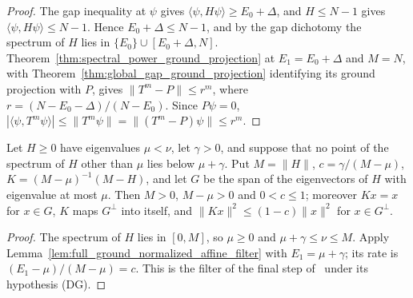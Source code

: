 \begin{proof}
    \leanok
    The gap inequality at $\psi$ gives $\langle\psi,H\psi\rangle\ge E_0+\Delta$,
    and $H\le N-1$ gives $\langle\psi,H\psi\rangle\le N-1$. Hence
    $E_0+\Delta\le N-1$, and by the gap dichotomy the spectrum of $H$ lies in
    $\{E_0\}\cup[E_0+\Delta,N]$. Theorem~\ref{thm:spectral_power_ground_projection}
    at $E_1=E_0+\Delta$ and $M=N$, with
    Theorem~\ref{thm:global_gap_ground_projection} identifying its ground
    projection with $P$, gives $\|T^m-P\|\le r^m$, where
    $r=(N-E_0-\Delta)/(N-E_0)$. Since $P\psi=0$,
    $|\langle\psi,T^m\psi\rangle|\le\|T^m\psi\|=\|(T^m-P)\psi\|\le r^m$.
\end{proof}

\begin{lemma}
    \label{lem:full_ground_affine_filter_norm}
    \leanok
    Let $H\ge0$ have eigenvalues $\mu<\nu$, let $\gamma>0$, and suppose that
    no point of the spectrum of $H$ other than $\mu$ lies below $\mu+\gamma$.
    Put $M=\|H\|$, $c=\gamma/(M-\mu)$, $K=(M-\mu)^{-1}(M-H)$, and let $G$ be
    the span of the eigenvectors of $H$ with eigenvalue at most $\mu$. Then
    $M>0$, $M-\mu>0$ and $0<c\le1$; moreover $Kx=x$ for $x\in G$, $K$ maps
    $G^\perp$ into itself, and $\|Kx\|^2\le(1-c)\|x\|^2$ for $x\in G^\perp$.
\end{lemma}

\begin{proof}
    \leanok
    The spectrum of $H$ lies in $[0,M]$, so $\mu\ge0$ and
    $\mu+\gamma\le\nu\le M$. Apply
    Lemma~\ref{lem:full_ground_normalized_affine_filter} with $E_1=\mu+\gamma$;
    its rate is $(E_1-\mu)/(M-\mu)=c$. This is the filter of the final step
    of~\cite[lines 1620--1643]{Arad2016RigorousRG} under its hypothesis (DG).
\end{proof}

